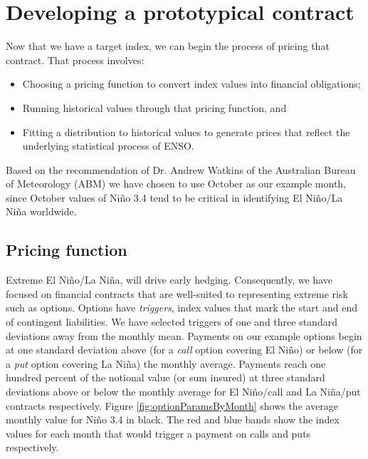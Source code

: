 \documentclass[authoryear]{article}
\begin{document}
\section{Developing a prototypical contract}
Now that we have a target index, we can begin the process of pricing that contract. That process involves:
\begin{itemize}
 \item Choosing a pricing function to convert index values into financial obligations;
 \item Running historical values through that pricing function, and 
 \item Fitting a distribution to historical values to generate prices that reflect the underlying statistical process of ENSO. 
\end{itemize}
Based on the recommendation of Dr. Andrew Watkins of the Australian Bureau of Meteorology (ABM) we have chosen to use October as our example month, since October values of Ni\~no 3.4 tend to be critical in identifying El Ni\~no/La Ni\~na worldwide. 

\subsection{Pricing function}
Extreme El Ni\~no/La Ni\~na, will drive early hedging. Consequently, we have focused on financial contracts that are well-suited to representing extreme risk such as options. Options have \emph{triggers}, index values that mark the start and end of contingent liabilities. We have selected triggers of one and three standard deviations away from the monthly mean.  Payments on our example options begin at one standard deviation above (for a \emph{call} option covering El Ni\~no) or below (for a \emph{put} option covering La Ni\~na) the monthly average. Payments reach one hundred percent of the notional value (or sum insured) at three standard deviations above or below the monthly average for El Ni\~no/call and La Ni\~na/put contracts respectively. Figure \ref{fig:optionParamsByMonth} shows the average monthly value for Ni\~no 3.4 in black. The red and blue bands show the index values for each month that would trigger a payment on calls and puts respectively.
\end{document}
